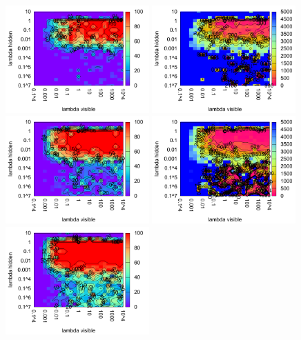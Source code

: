 \begin{figure}[H]
  \centering
  \includegraphics[width=0.49\textwidth]{img/k3/tlr-3-success.pdf} 
  \includegraphics[width=0.49\textwidth]{img/k3/tlr-3-epoch.pdf}   
  \includegraphics[width=0.49\textwidth]{img/k3/tlr-4-success.pdf} 
  \includegraphics[width=0.49\textwidth]{img/k3/tlr-4-epoch.pdf}   
  \includegraphics[width=0.49\textwidth]{img/k3/tlr-5-success.pdf}   

\end{figure}
